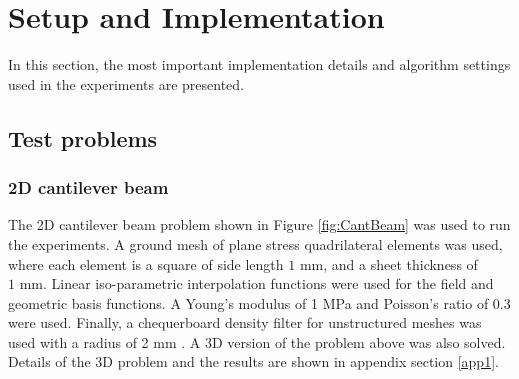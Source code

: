 \section{Setup and Implementation} \label{sec:exp_impl}

  In this section, the most important implementation details and algorithm settings used in the experiments are presented.

  \subsection{Test problems}

    \subsubsection{2D cantilever beam}

      

      The 2D cantilever beam problem shown in Figure \ref{fig:CantBeam} was used to run the experiments. A ground mesh of plane stress quadrilateral elements was used, where each element is a square of side length $1 \text{ mm}$, and a sheet thickness of $1 \text{ mm}$. Linear iso-parametric interpolation functions were used for the field and geometric basis functions. A Young's modulus of 1 MPa and Poisson's ratio of 0.3 were used. Finally, a chequerboard density filter for unstructured meshes was used with a radius of 2 mm \citep{Huang2010a}. A 3D version of the problem above was also solved. Details of the 3D problem and the results are shown in appendix section \ref{app1}.

